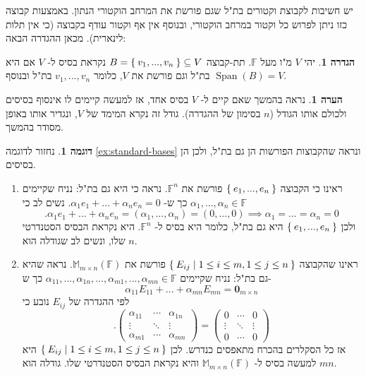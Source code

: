 \documentclass[12pt]{report}
\theoremstyle{plain}
\theoremstyle{definition}
\newtheorem{definition}[theorem]{הגדרה}
\newtheorem{example}{דוגמה}[chapter]
\newtheorem{remark}{הערה}[chapter]
\newcommand{\F}{\mathbb{F}}
\newcommand{\M}{\mathbb{M}}
\newcommand{\0}{\mathbf{0}}
\DeclareMathOperator{\Span}{Span}
\begin{document}
יש חשיבות לקבוצת וקטורים בת"ל שגם פורשת את המרחב הוקטורי הנתון. באמצעות קבוצה כזו ניתן לפרוש כל וקטור במרחב הוקטורי, ובנוסף אין אף וקטור עודף בקבוצה (כי אין תלות לינארית). מכאן ההגדרה הבאה:

\begin{definition}
יהי
$V$
מ"ו מעל
$\F$.
תת-קבוצה
$B=\Set{v_1,...,v_n}\subseteq V$
נקראת בסיס ל-
$V$
אם היא בת"ל וגם פורשת את 
$V$,
כלומר
$v_1,...,v_n$
בת"ל ובנוסף 
$\Span(B)=V$.
\end{definition}

\begin{remark}
נראה בהמשך שאם קיים ל-
$V$
בסיס אחד, אז למעשה קיימים לו אינסוף בסיסים ולכולם אותו הגודל 
($n$
בסימון של ההגדרה).
גודל זה נקרא המימד של 
$V$, 
ונגדיר אותו באופן מסודר בהמשך.
\end{remark}

\begin{example}
נחזור לדוגמה
\ref{ex:standard-bases}
ונראה שהקבוצות הפורשות הן גם בת"ל, ולכן הן בסיסים.

\begin{enumerate}[label=\alph*.]
\item
ראינו כי הקבוצה 
$\Set{e_1,...,e_n}$
פורשת את 
$\F^n$.
נראה כי היא גם בת"ל: נניח שקיימים 
$\alpha_1,...,\alpha_n\in\F$
כך ש-
$\alpha_1e_1+...+\alpha_ne_n=0$.
נשים לב כי
$$
.\alpha_1e_1+...+\alpha_ne_n=(\alpha_1,...,\alpha_n)=(0,...,0) \implies \alpha_1=...=\alpha_n=0
$$
ולכן 
$\Set{e_1,...,e_n}$
היא גם בת"ל, כלומר
היא בסיס ל-
$\F^n$.
היא נקראת הבסיס הסטנדרטי שלו, ונשים לב שגודלה הוא 
$n$.

\item 
ראינו שהקבוצה
$\Set{E_{ij}|1\leq i\leq m,1\leq j\leq n}$
פורשת את 
$\M_{m\times n}(\F)$.
נראה שהיא גם בת"ל: נניח שקיימים
$\alpha_{11},...,\alpha_{1n},...,\alpha_{m1},...,\alpha_{mn}\in\F$
כך ש-
$$
\alpha_{11}E_{11}+...+\alpha_{mn}E_{mn}=\0_{m\times n}
$$
לפי ההגדרה של 
$E_{ij}$
נובע כי
$$
.\begin{pmatrix}
\alpha_{11} & \cdots &\alpha_{1n} \\
\vdots & \ddots &\vdots \\
\alpha_{m1} & \cdots &\alpha_{mn} 
\end{pmatrix}=\begin{pmatrix}
0 & \cdots & 0 \\
\vdots &\ddots &\vdots \\
0 &\cdots & 0
\end{pmatrix}
$$
אז כל הסקלרים בהכרח מתאפסים כנדרש. לכן
$\Set{E_{ij}|1\leq i\leq m,1\leq j\leq n}$
היא למעשה בסיס ל-
$\M_{m\times n}(\F)$
והיא נקראת הבסיס הסטנדרטי שלו.
גודלה הוא 
$mn$.


\end{enumerate}
\end{example}
\end{document}
